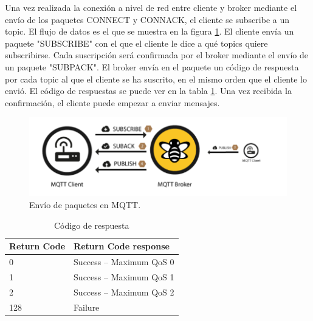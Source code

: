 \documentclass[12pt, twoside]{book}
\begin{document}
Una vez realizada la conexión a nivel de red entre cliente y broker mediante el envío de los paquetes CONNECT y CONNACK, el cliente se subscribe a un topic. El flujo de datos es el que se muestra en la figura \ref{L403}. El cliente envía un paquete "SUBSCRIBE" con el que el cliente le dice a qué topics quiere subscribirse. Cada suscripción será confirmada por el broker mediante el envío de un paquete "SUBPACK". El broker envía en el paquete un código de respuesta por cada topic al que el cliente se ha suscrito, en el mismo orden que el cliente lo envió. El código de respuestas se puede ver en la tabla \ref{table:return_code}. Una vez recibida la confirmación, el cliente puede empezar a enviar mensajes.
\begin{figure}[H]
\centering
\includegraphics[scale=0.5]{images/flujo_tipico.png}
\caption{Envío de paquetes en MQTT.}\label{L403}
\end{figure}
\begin{table}[htbp]
\begin{center}
\begin{tabular}{|l|l|}
\hline
Return Code & Return Code response \\
\hline \hline
0 & Success – Maximum QoS 0 \\ \hline
1 & Success – Maximum QoS 1 \\ \hline
2 & Success – Maximum QoS 2 \\ \hline
128 & Failure
\end{tabular}
\caption{Código de respuesta}
\label{table:return_code}
\end{center}
\end{table}
\end{document}
